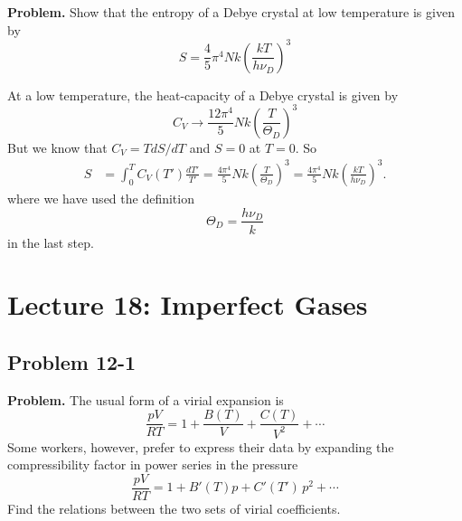 \documentclass[twocolumn, 10pt]{article}
\numberwithin{equation}{section}
\newenvironment{problem}
{\par\medskip \color{problemblue}
  \textbf{Problem. }\ignorespaces}
{\medskip}
\newenvironment{solution}[1][\empty]
{\par\medskip\sffamily
  \textbf{\ifx\empty#1{Solution.}\relax\else{#1}\fi} \ignorespaces}
{\medskip}
\begin{document}
\begin{problem}
  Show that the entropy of a Debye crystal at low
  temperature is given by
  $$
  S = \frac{4}{5} \pi^4 N k \left(\frac{kT}{h\nu_D}\right)^3
  $$
\end{problem}

\begin{solution}
  At a low temperature,
  the heat-capacity of a Debye crystal is given by
  \begin{equation}
    C_V \to \frac{ 12 \pi^4} { 5}
    N k \left( \frac{ T } { \Theta_D } \right)^3
    \tag{11-31}
  \end{equation}
  But we know that $C_V = TdS/dT$ and $S = 0$ at $T = 0$.
  So
  \begin{align*}
    S &= \int_0^T C_V(T') \frac{dT'}{T'}
    =
    \frac{ 4 \pi^4}{5}
    N k \left( \frac{T}{\Theta_D} \right)^3
    =
    \frac{ 4 \pi^4}{5}
    N k \left( \frac{k T}{h \nu_D} \right)^3
    .
  \end{align*}
  where we have used the definition
  \begin{equation}
    \Theta_D = \frac{ h \nu_D } { k}
    \tag{11-27}
  \end{equation}
  in the last step.
\end{solution}

\section{Lecture 18: Imperfect Gases}

\subsection{Problem 12-1}

\begin{problem}
  The usual form of a virial expansion is
  \begin{equation}
    \frac{pV}{RT}
    =
    1 + \frac{B(T)} {V} + \frac{C(T)}{V^2} + \cdots
    \label{eq:vir_invV}
  \end{equation}
  Some workers, however, prefer to express their data
  by expanding the compressibility factor
  in power series in the pressure
  $$
  \frac{ pV}{RT}
  =
  1+ B'(T) p + C'(T') \, p^2 + \cdots
  $$
  Find the relations between the two sets of virial coefficients.
\end{problem}
\end{document}

